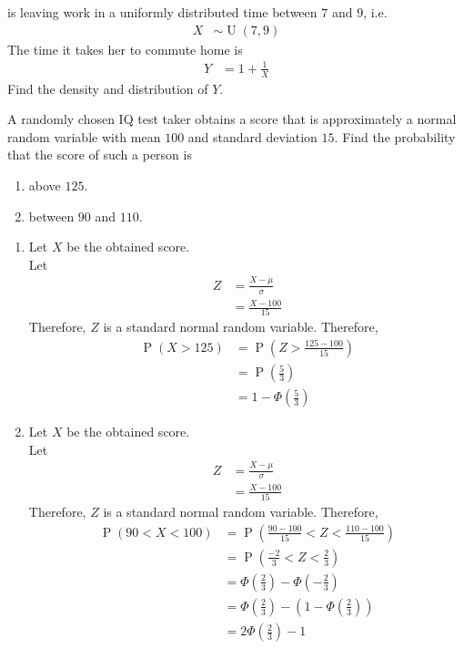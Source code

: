 \documentclass[fleqn, a4paper, 11pt, oneside]{amsart}
\theoremstyle{definition}
\theoremstyle{theorem}
\DeclareMathOperator{\prob}{\mathrm{P}}
\DeclareMathOperator{\uniform}{\mathrm{U}}
\newcommand{\A}{\text{Alice}\xspace}
\begin{document}
\begin{question}
	\A is leaving work in a uniformly distributed time between $7$ and $9$, i.e.
	\begin{align*}
		X &\sim \uniform(7,9)
	\end{align*}
	The time it takes her to commute home is
	\begin{align*}
		Y &= 1 + \frac{1}{X}
	\end{align*}
	Find the density and distribution of $Y$.
\end{question}

\begin{question}
	A randomly chosen IQ test taker obtains a score that is approximately a normal random variable with mean $100$ and standard deviation $15$.
	Find the probability that the score of such a person is
	\begin{enumerate}
		\item above $125$.
		\item between $90$ and $110$.
	\end{enumerate}
\end{question}

\begin{solution}
	\begin{enumerate}[leftmargin=*]
		\item 
			Let $X$ be the obtained score.\\
			Let
			\begin{align*}
				Z &= \frac{X - \mu}{\sigma}\\
				&= \frac{X - 100}{15}
			\end{align*}
			Therefore, $Z$ is a standard normal random variable.
			Therefore,
			\begin{align*}
				\prob(X > 125) &= \prob\left( Z > \frac{125 - 100}{15} \right)\\
				&= \prob\left( \frac{5}{3} \right)\\
				&= 1 - \Phi\left( \frac{5}{3} \right)
			\end{align*}
		\item
			Let $X$ be the obtained score.\\
			Let
			\begin{align*}
				Z &= \frac{X - \mu}{\sigma}\\
				&= \frac{X - 100}{15}
			\end{align*}
			Therefore, $Z$ is a standard normal random variable.
			Therefore,
			\begin{align*}
				\prob(90 < X < 100) &= \prob\left( \frac{90 - 100}{15} < Z < \frac{110 - 100}{15} \right)\\
				&= \prob\left( \frac{-2}{3} < Z < \frac{2}{3} \right)\\
				&= \Phi\left( \frac{2}{3} \right) - \Phi\left( -\frac{2}{3} \right)\\
				&= \Phi\left( \frac{2}{3} \right) - \left( 1 - \Phi\left( \frac{2}{3} \right) \right)\\
				&= 2 \Phi\left( \frac{2}{3} \right) - 1
			\end{align*}
	\end{enumerate}
\end{solution}
\end{document}
